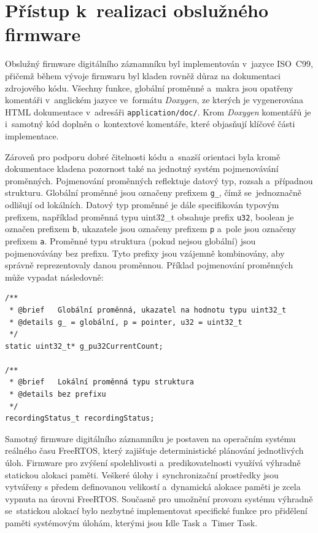 \newpage


\chapter{Přístup k~realizaci obslužného firmware}
\label{softwarova_implementace}
Obslužný firmware digitálního záznamníku byl implementován v~jazyce ISO~C99, přičemž během vývoje firmwaru byl kladen rovněž důraz na dokumentaci zdrojového kódu. Všechny funkce, globální proměnné a~makra jsou opatřeny komentáři v~anglickém jazyce ve~formátu \textit{Doxygen}, ze kterých je vygenerována HTML dokumentace v~adresáři \texttt{application/doc/}. Krom \textit{Doxygen} komentářů je i~samotný kód doplněn o~kontextové komentáře, které objasňují klíčové části implementace.

Zároveň pro podporu dobré čitelnosti kódu a~snazší orientaci byla kromě dokumentace kladena pozornost také na jednotný systém pojmenovávání proměnných. Pojmenování proměnných reflektuje datový typ, rozsah a~případnou strukturu. Globální proměnné jsou označeny prefixem \texttt{g\_}, čímž se~jednoznačně odlišují od lokálních. Datový typ proměnné je dále specifikován typovým prefixem, například proměnná typu uint32\_t obsahuje prefix \texttt{u32}, boolean je označen prefixem \texttt{b}, ukazatele jsou označeny prefixem \texttt{p} a~pole jsou označeny prefixem \texttt{a}. Proměnné typu struktura (pokud nejsou globální) jsou pojmenovávány bez prefixu. Tyto prefixy jsou vzájemně kombinovány, aby správně reprezentovaly danou proměnnou. Příklad pojmenování proměnných může vypadat následovně:

\begin{verbatim}
/**
 * @brief 	Globální proměnná, ukazatel na hodnotu typu uint32_t
 * @details g_ = globální, p = pointer, u32 = uint32_t
 */
static uint32_t* g_pu32CurrentCount;

/**
 * @brief 	Lokální proměnná typu struktura
 * @details bez prefixu
 */
recordingStatus_t recordingStatus;
\end{verbatim}

\newpage

Samotný firmware digitálního záznamníku je postaven na operačním systému reálného času FreeRTOS, který zajišťuje deterministické plánování jednotlivých úloh. Firmware pro zvýšení spolehlivosti a~predikovatelnosti využívá výhradně statickou alokaci paměti. Veškeré úlohy i~synchronizační prostředky jsou vytvářeny s předem definovanou velikostí a~dynamická alokace paměti je zcela vypnuta na úrovni FreeRTOS. Současně pro umožnění provozu systému výhradně se~statickou alokací bylo nezbytné implementovat specifické funkce pro přidělení paměti systémovým úlohám, kterými jsou Idle Task a~Timer Task.~\cite{freertos_book}


